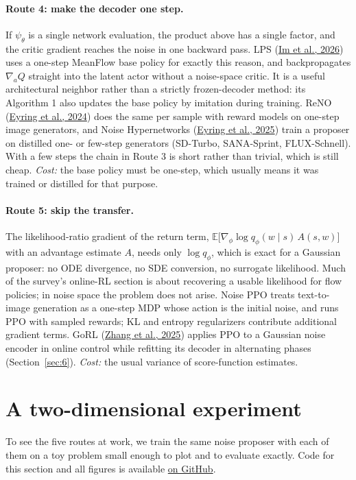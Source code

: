 \paragraph{Route 4: make the decoder one step.} If $\psi_\theta$ is a single network evaluation, the product above has a single factor, and the critic gradient reaches the noise in one backward pass. LPS (\hyperlink{ref:5}{Im et al., 2026}) uses a one-step MeanFlow base policy for exactly this reason, and backpropagates $\nabla_a Q$ straight into the latent actor without a noise-space critic. It is a useful architectural neighbor rather than a strictly frozen-decoder method: its Algorithm 1 also updates the base policy by imitation during training. ReNO (\hyperlink{ref:3}{Eyring et al., 2024}) does the same per sample with reward models on one-step image generators, and Noise Hypernetworks (\hyperlink{ref:4}{Eyring et al., 2025}) train a proposer on distilled one- or few-step generators (SD-Turbo, SANA-Sprint, FLUX-Schnell). With a few steps the chain in Route 3 is short rather than trivial, which is still cheap. \emph{Cost:} the base policy must be one-step, which usually means it was trained or distilled for that purpose.

\paragraph{Route 5: skip the transfer.} The likelihood-ratio gradient of the return term, $\mathbb{E}\big[\nabla_\phi \log q_\phi(w \mid s)\, A(s, w)\big]$ with an advantage estimate $A$, needs only $\log q_\phi$, which is exact for a Gaussian proposer: no ODE divergence, no SDE conversion, no surrogate likelihood. Much of the survey's online-RL section is about recovering a usable likelihood for flow policies; in noise space the problem does not arise. Noise PPO treats text-to-image generation as a one-step MDP whose action is the initial noise, and runs PPO with sampled rewards; KL and entropy regularizers contribute additional gradient terms. GoRL (\hyperlink{ref:20}{Zhang et al., 2025}) applies PPO to a Gaussian noise encoder in online control while refitting its decoder in alternating phases (Section~\ref{sec:6}). \emph{Cost:} the usual variance of score-function estimates.

\section{A two-dimensional experiment}
\label{sec:4}
To see the five routes at work, we train the same noise proposer with each of them on a toy problem small enough to plot and to evaluate exactly. Code for this section and all figures is available \href{https://github.com/Chi-Shan0707/find-the-golden-noise}{on GitHub}.

